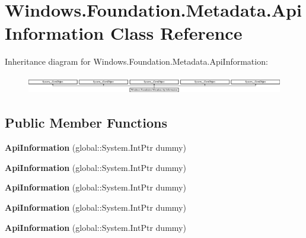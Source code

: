 \hypertarget{class_windows_1_1_foundation_1_1_metadata_1_1_api_information}{}\section{Windows.\+Foundation.\+Metadata.\+Api\+Information Class Reference}
\label{class_windows_1_1_foundation_1_1_metadata_1_1_api_information}
Inheritance diagram for Windows.\+Foundation.\+Metadata.\+Api\+Information\+:\begin{figure}[H]
\begin{center}
\leavevmode
\includegraphics[height=0.805755cm]{class_windows_1_1_foundation_1_1_metadata_1_1_api_information}
\end{center}
\end{figure}
\subsection*{Public Member Functions}
\begin{DoxyCompactItemize}
\item 
\mbox{\label{class_windows_1_1_foundation_1_1_metadata_1_1_api_information_ab504c728436fd9033335ca4bb8121fcb}} 
{\bfseries Api\+Information} (global\+::\+System.\+Int\+Ptr dummy)
\item 
\mbox{\label{class_windows_1_1_foundation_1_1_metadata_1_1_api_information_ab504c728436fd9033335ca4bb8121fcb}} 
{\bfseries Api\+Information} (global\+::\+System.\+Int\+Ptr dummy)
\item 
\mbox{\label{class_windows_1_1_foundation_1_1_metadata_1_1_api_information_ab504c728436fd9033335ca4bb8121fcb}} 
{\bfseries Api\+Information} (global\+::\+System.\+Int\+Ptr dummy)
\item 
\mbox{\label{class_windows_1_1_foundation_1_1_metadata_1_1_api_information_ab504c728436fd9033335ca4bb8121fcb}} 
{\bfseries Api\+Information} (global\+::\+System.\+Int\+Ptr dummy)
\item 
\mbox{\label{class_windows_1_1_foundation_1_1_metadata_1_1_api_information_ab504c728436fd9033335ca4bb8121fcb}} 
{\bfseries Api\+Information} (global\+::\+System.\+Int\+Ptr dummy)
\end{DoxyCompactItemize}
